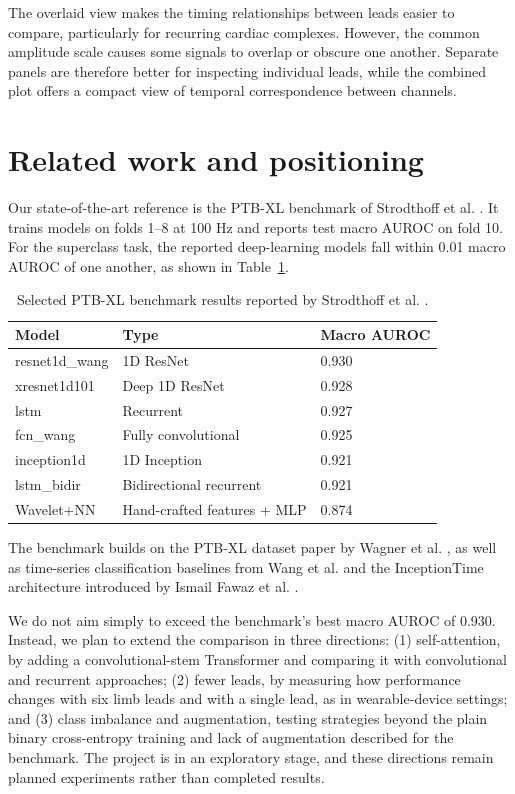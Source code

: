 \documentclass{article}
\begin{document}
The overlaid view makes the timing relationships between leads easier to compare, particularly for recurring cardiac complexes. However, the common amplitude scale causes some signals to overlap or obscure one another. Separate panels are therefore better for inspecting individual leads, while the combined plot offers a compact view of temporal correspondence between channels.

\section{Related work and positioning}

Our state-of-the-art reference is the PTB-XL benchmark of Strodthoff et al. \citep{strodthoff2021}. It trains models on folds 1--8 at 100 Hz and reports test macro AUROC on fold 10. For the superclass task, the reported deep-learning models fall within 0.01 macro AUROC of one another, as shown in Table~\ref{tab:benchmark}.

\begin{table}[H]
  \caption{Selected PTB-XL benchmark results reported by Strodthoff et al. \citep{strodthoff2021}.}
  \label{tab:benchmark}
  \centering
  \begin{tabular}{lll}
    \toprule
    Model & Type & Macro AUROC \\
    \midrule
    resnet1d\_wang & 1D ResNet & 0.930 \\
    xresnet1d101 & Deep 1D ResNet & 0.928 \\
    lstm & Recurrent & 0.927 \\
    fcn\_wang & Fully convolutional & 0.925 \\
    inception1d & 1D Inception & 0.921 \\
    lstm\_bidir & Bidirectional recurrent & 0.921 \\
    Wavelet+NN & Hand-crafted features + MLP & 0.874 \\
    \bottomrule
  \end{tabular}
\end{table}

The benchmark builds on the PTB-XL dataset paper by Wagner et al. \citep{wagner2020}, as well as time-series classification baselines from Wang et al. \citep{wang2017} and the InceptionTime architecture introduced by Ismail Fawaz et al. \citep{ismailfawaz2020}.

We do not aim simply to exceed the benchmark's best macro AUROC of 0.930. Instead, we plan to extend the comparison in three directions: (1) self-attention, by adding a convolutional-stem Transformer and comparing it with convolutional and recurrent approaches; (2) fewer leads, by measuring how performance changes with six limb leads and with a single lead, as in wearable-device settings; and (3) class imbalance and augmentation, testing strategies beyond the plain binary cross-entropy training and lack of augmentation described for the benchmark. The project is in an exploratory stage, and these directions remain planned experiments rather than completed results.
\end{document}

